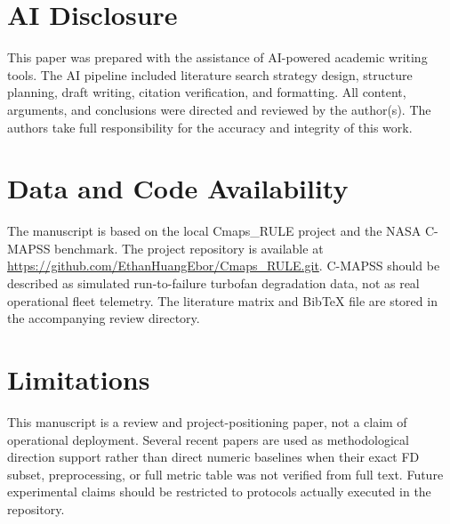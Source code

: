 \documentclass[conference]{IEEEtran}
\begin{document}
\section*{AI Disclosure}
This paper was prepared with the assistance of AI-powered academic writing tools. The AI pipeline included literature search strategy design, structure planning, draft writing, citation verification, and formatting. All content, arguments, and conclusions were directed and reviewed by the author(s). The authors take full responsibility for the accuracy and integrity of this work.

\section*{Data and Code Availability}
The manuscript is based on the local Cmaps\_RULE project and the NASA C-MAPSS benchmark. The project repository is available at \url{https://github.com/EthanHuangEbor/Cmaps_RULE.git}. C-MAPSS should be described as simulated run-to-failure turbofan degradation data, not as real operational fleet telemetry. The literature matrix and BibTeX file are stored in the accompanying review directory.

\section*{Limitations}
This manuscript is a review and project-positioning paper, not a claim of operational deployment. Several recent papers are used as methodological direction support rather than direct numeric baselines when their exact FD subset, preprocessing, or full metric table was not verified from full text. Future experimental claims should be restricted to protocols actually executed in the repository.

\nocite{*}


\end{document}
